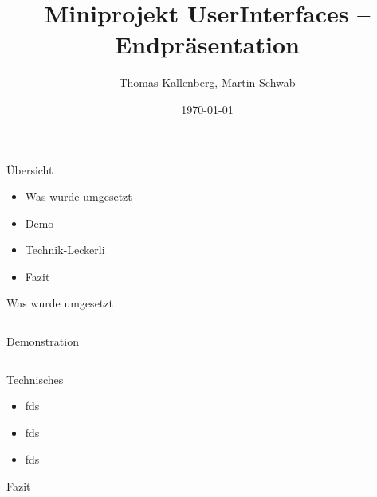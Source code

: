 \documentclass[]{beamer}
\title{Miniprojekt UserInterfaces -- Endpräsentation}
\author{Thomas Kallenberg, Martin Schwab}
\institute{HSR Hochschule Rapperswil}
\date{ \today }
\begin{document}
\begin{frame}
  \titlepage
\end{frame}

\begin{frame}{Übersicht}
\begin{itemize}
\item Was wurde umgesetzt
\item Demo
\item Technik-Leckerli
\item Fazit
\end{itemize}
\end{frame}

\begin{frame}{Was wurde umgesetzt}
\begin{columns}[t]
  \begin{column}{5cm}
  \end{column}
  \begin{column}{5cm}
  \end{column}
\end{columns}
\end{frame}

\begin{frame}{Demonstration}
\begin{columns}[t]
  \begin{column}{5cm}
  \end{column}
  \begin{column}{5cm}
  \end{column}
\end{columns}
\end{frame}

\begin{frame}{Technisches}
\begin{itemize}
\item<1-> fds
\item<2-> fds
\item<3-4> fds
\end{itemize}
\end{frame}

\begin{frame}{Fazit}
\end{frame}
\end{document}
